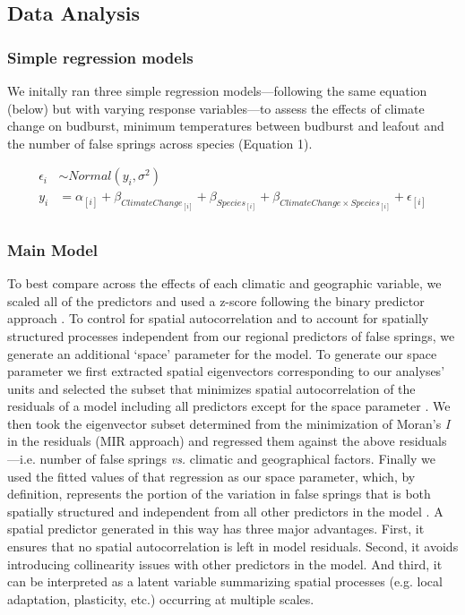 \documentclass{article}\usepackage[]{graphicx}\usepackage[]{color}
\begin{document}
\subsection*{Data Analysis} 
\subsubsection*{Simple regression models}
We initally ran three simple regression models---following the same equation (below) but with varying response variables---to assess the effects of climate change on budburst, minimum temperatures between budburst and leafout and the number of false springs across species (Equation 1).

\begin{align*}
\epsilon_i & \sim Normal(y_i ,  \sigma^{2}) \tag{1}\\
y_i &= \alpha_{[i]} + \beta_{ClimateChange_{[i]}} + \beta_{Species_{[i]}} + \beta_{ClimateChange \times Species_{[i]}} + \epsilon_{[i]} \nonumber\\
\end{align*}

\subsubsection*{Main Model}
To best compare across the effects of each climatic and geographic variable, we scaled all of the predictors and used a z-score following the binary predictor approach \citep{Gelman2006}. To control for spatial autocorrelation and to account for spatially structured processes independent from our regional predictors of false springs, we generate an additional `space' parameter for the model. To generate our space parameter we first extracted spatial eigenvectors corresponding to our analyses' units and selected the subset that minimizes spatial autocorrelation of the residuals of a model including all predictors except for the space parameter \citep[][, see supplemental materials `Methods: Spatial parameter' for more details]{Baumen2017,diniz2012selection}. We then took the eigenvector subset determined from the minimization of Moran's \textit{I} in the residuals (MIR approach) and regressed them against the above residuals---i.e. number of false springs \emph{vs.} climatic and geographical factors. Finally we used the fitted values of that regression as our space parameter, which, by definition, represents the portion of the variation in false springs that is both spatially structured and independent from all other predictors in the model \citep[e.g. average spring temperature, elevation, etc.][]{griffith2006spatial,morales2012imprint}. A spatial predictor generated in this way has three major advantages. First, it ensures that no spatial autocorrelation is left in model residuals. Second, it avoids introducing collinearity issues with other predictors in the model. And third, it can be interpreted as a latent variable summarizing spatial processes (e.g. local adaptation, plasticity, etc.) occurring at multiple scales.
\end{document}
